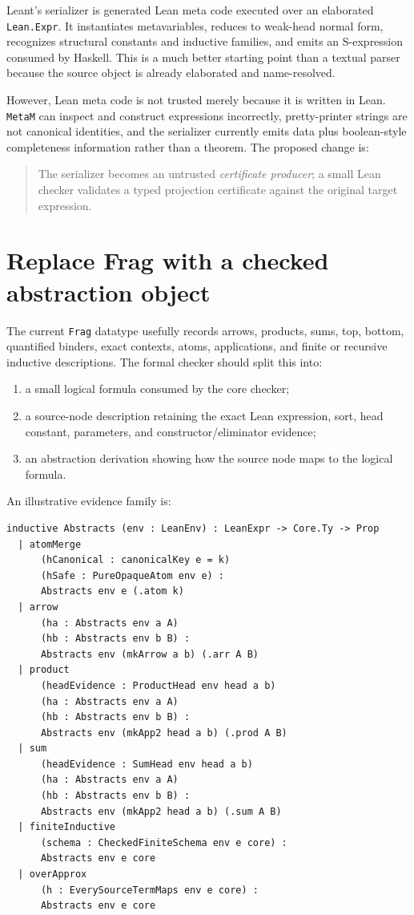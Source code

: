 \documentclass[11pt,letterpaper,openany]{report}
\theoremstyle{definition}
\theoremstyle{remark}
\newcommand{\code}[1]{\texttt{#1}}
\begin{document}
Leant's serializer is generated Lean meta code executed over an elaborated \code{Lean.Expr}. It instantiates metavariables, reduces to weak-head normal form, recognizes structural constants and inductive families, and emits an S-expression consumed by Haskell. This is a much better starting point than a textual parser because the source object is already elaborated and name-resolved.

However, Lean meta code is not trusted merely because it is written in Lean. \code{MetaM} can inspect and construct expressions incorrectly, pretty-printer strings are not canonical identities, and the serializer currently emits data plus boolean-style completeness information rather than a theorem. The proposed change is:

\begin{quote}
The serializer becomes an untrusted \emph{certificate producer}; a small Lean checker validates a typed projection certificate against the original target expression.
\end{quote}

\section{Replace Frag with a checked abstraction object}

The current \code{Frag} datatype usefully records arrows, products, sums, top, bottom, quantified binders, exact contexts, atoms, applications, and finite or recursive inductive descriptions. The formal checker should split this into:

\begin{enumerate}
\item a small logical formula consumed by the core checker;
\item a source-node description retaining the exact Lean expression, sort, head constant, parameters, and constructor/eliminator evidence;
\item an abstraction derivation showing how the source node maps to the logical formula.
\end{enumerate}

An illustrative evidence family is:

\begin{lstlisting}[language=LeanFour,caption={Projection evidence should explain each abstraction step.}]
inductive Abstracts (env : LeanEnv) : LeanExpr -> Core.Ty -> Prop
  | atomMerge
      (hCanonical : canonicalKey e = k)
      (hSafe : PureOpaqueAtom env e) :
      Abstracts env e (.atom k)
  | arrow
      (ha : Abstracts env a A)
      (hb : Abstracts env b B) :
      Abstracts env (mkArrow a b) (.arr A B)
  | product
      (headEvidence : ProductHead env head a b)
      (ha : Abstracts env a A)
      (hb : Abstracts env b B) :
      Abstracts env (mkApp2 head a b) (.prod A B)
  | sum
      (headEvidence : SumHead env head a b)
      (ha : Abstracts env a A)
      (hb : Abstracts env b B) :
      Abstracts env (mkApp2 head a b) (.sum A B)
  | finiteInductive
      (schema : CheckedFiniteSchema env e core) :
      Abstracts env e core
  | overApprox
      (h : EverySourceTermMaps env e core) :
      Abstracts env e core
\end{lstlisting}
\end{document}
